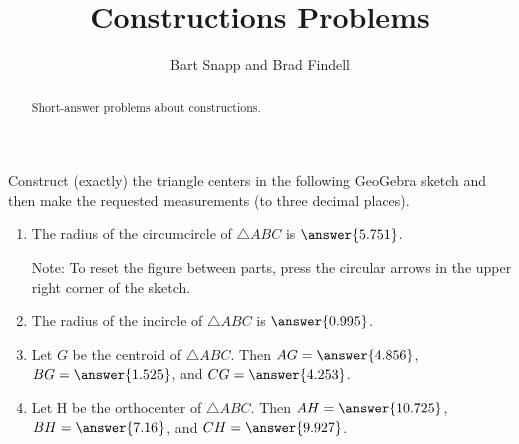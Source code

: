 \documentclass[nooutcomes]{ximera}
\title{Constructions Problems}
\author{Bart Snapp and Brad Findell}
\begin{document}
\begin{abstract}
Short-answer problems about constructions. 
\end{abstract}
\maketitle


\begin{problem}
Construct (exactly) the triangle centers in the following 
GeoGebra sketch and then make the requested measurements (to three decimal places).  

\begin{center}  
\end{center}
\begin{enumerate}
\item The radius of the circumcircle of $\triangle ABC$ is 
$\answer{5.751}$.  

Note: To reset the figure between parts, press the circular arrows in the upper right corner of the sketch.   

\item The radius of the incircle of $\triangle ABC$ is 
$\answer{0.995}$.  

\item Let $G$ be the centroid of $\triangle ABC$.  
Then $AG = \answer{4.856}$, $BG = \answer{1.525}$, 
and $CG = \answer{4.253}$.  

\item Let H be the orthocenter of $\triangle ABC$. 
Then $AH = \answer{10.725}$, $BH = \answer{7.16}$, 
and $CH = \answer{9.927}$. 
\end{enumerate}

\end{problem}
\end{document}
